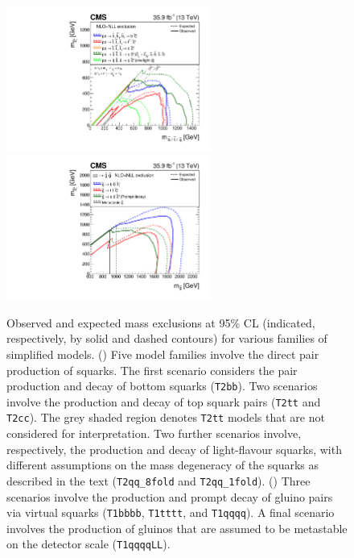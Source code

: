 \begin{figure}[!t]
  \centering
  \includegraphics[width=0.6\textwidth]{Figures/squarkSUMMARY.pdf}\\
  \includegraphics[width=0.6\textwidth]{Figures/gluinoAllSUMMARY.pdf}\\
  \caption{Observed and expected mass exclusions at 95\% CL
    (indicated, respectively, by solid and dashed contours) for
    various families of simplified models. 
    (\cmsLeft) Five model families involve the direct pair
    production of squarks. The first scenario considers the pair
    production and decay of bottom squarks (\texttt{T2bb}). Two
    scenarios involve the production and decay of top squark pairs
    (\texttt{T2tt} and \texttt{T2cc}). The grey shaded region denotes
    \texttt{T2tt} models that are not considered for
    interpretation. Two further scenarios involve, respectively, the 
    production and decay of light-flavour squarks, with different
    assumptions on the mass degeneracy of the squarks as described in
    the text (\texttt{T2qq\_8fold} and \texttt{T2qq\_1fold}). 
    (\cmsRight) Three scenarios involve the production and prompt
    decay of gluino pairs via virtual squarks (\texttt{T1bbbb},
    \texttt{T1tttt}, and \texttt{T1qqqq}). A final scenario involves
    the production of gluinos that are assumed to be metastable on the
    detector scale (\texttt{T1qqqqLL}).}
  \label{fig:limits-sms} 
\end{figure}

